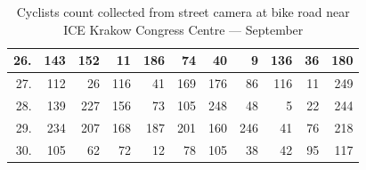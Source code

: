 \begin{table}[H]
{\begin{tabular}{|r|r|r|r|r|r|r|r|r|r|r|}
26.                    & 143                            & 152                             & 11                               & 186                              & 74                               & 40                               & 9                                & 136                              & 36                               & 180                              \\ \hline
27.                    & 112                            & 26                              & 116                              & 41                               & 169                              & 176                              & 86                               & 116                              & 11                               & 249                              \\ \hline
28.                    & 139                            & 227                             & 156                              & 73                               & 105                              & 248                              & 48                               & 5                                & 22                               & 244                              \\ \hline
29.                    & 234                            & 207                             & 168                              & 187                              & 201                              & 160                              & 246                              & 41                               & 76                               & 218                              \\ \hline
30.                    & 105                            & 62                              & 72                               & 12                               & 78                               & 105                              & 38                               & 42                               & 95                               & 117                              \\ \hline
\end{tabular}}
\caption{Cyclists count collected from street camera at bike road near ICE Krakow Congress Centre --- September}
\label{tab:iceCountSeptember}
\end{table}
